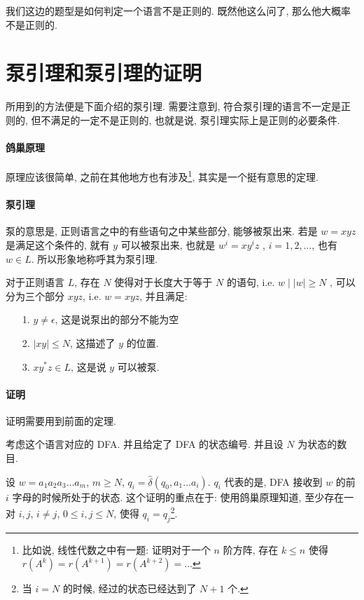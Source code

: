 \documentclass[../main_part1.tex]{subfiles}
\begin{document}
我们这边的题型是如何判定一个语言不是正则的. 既然他这么问了, 那么他大概率不是正则的. 
\section{泵引理和泵引理的证明}\label{sec:beng}
所用到的方法便是下面介绍的泵引理. 需要注意到, 符合泵引理的语言不一定是正则的, 但不满足的一定不是正则的, 也就是说, 泵引理实际上是正则的必要条件. 
\paragraph{鸽巢原理}
原理应该很简单, 之前在其他地方也有涉及\footnote{比如说, 线性代数之中有一题: 证明对于一个 \(n\) 阶方阵, 存在 \(k \le n\) 使得 \(r (A ^{k} )= r (A ^{k + 1} ) = r (A ^{k + 2} ) = \dots\)}, 其实是一个挺有意思的定理. 

\paragraph{泵引理} 泵的意思是, 正则语言之中的有些语句之中某些部分, 能够被泵出来. 若是 \(w = x y z \) 是满足这个条件的, 就有 \( y\) 可以被泵出来, 也就是 \( w^{i}   =  x y ^{i} z \) , \( i  = 1 , 2 , \dots \), 也有 \(w \in L \). 所以形象地称呼其为泵引理. 

\begin{thm}
	对于正则语言 \(L\), 存在 \(N\) 使得对于长度大于等于 \(N\) 的语句, i.e. \(w \mid |w | \ge N\) , 可以分为三个部分 \(xyz\), i.e. \(w = xyz\), 并且满足: 
\begin{itemize}
\item [1.] \(y \ne \epsilon\), 这是说泵出的部分不能为空
\item [2.] \(|xy | \le N\), 这描述了 \(y\) 的位置. 
\item [3.] \(x y^{*} z \in L\), 这是说 \(y\) 可以被泵. 
\end{itemize}
\end{thm}

\paragraph{证明}
证明需要用到前面的定理.  

考虑这个语言对应的 DFA. 并且给定了 DFA 的状态编号. 并且设 \(N\) 为状态的数目.  

设 \(w = a_{1} a_{2} a_{3} \dots a_{m}\), \(m \ge N\), \(q_{i} = \hat{\delta} (q_{0} , a_{1} \dots a_{i})\). \(q_{i}\) 代表的是, DFA 接收到 \(w\) 的前 \(i\) 字母的时候所处于的状态. 这个证明的重点在于: 使用鸽巢原理知道, 至少存在一对 \(i, j\), \(i \ne j\), \( 0 \le  i , j \le N\), 使得 \(q_{i} = q_{j}\)\footnote{当 \( i = N\) 的时候, 经过的状态已经达到了 \(N  + 1\) 个.}. 
\end{document}
